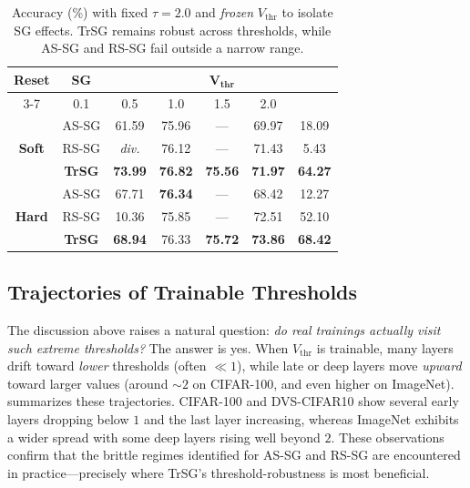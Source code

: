 \begin{table}[h]
\centering
\small
\begin{tabular}{cc|ccccc}
\toprule
\textbf{Reset} & \textbf{SG} & \multicolumn{5}{c}{$\boldsymbol{V_{\text{thr}}}$} \\
\cmidrule(lr){3-7}
\multicolumn{2}{c|}{} & 0.1 & 0.5 & 1.0 & 1.5 & 2.0 \\
\midrule
\multirow{3}{*}{\textbf{Soft}}
  & AS-SG          & 61.59          & 75.96          & ---            & 69.97          & 18.09 \\
  & RS-SG          & \emph{div.}    & 76.12          & ---            & 71.43          & 5.43  \\
  & \textbf{TrSG}  & \textbf{73.99} & \textbf{76.82} & \textbf{75.56} & \textbf{71.97} & \textbf{64.27} \\
\midrule
\multirow{3}{*}{\textbf{Hard}}
  & AS-SG          & 67.71          & \textbf{76.34} & ---            & 68.42          & 12.27 \\
  & RS-SG          & 10.36          & 75.85          & ---            & 72.51          & 52.10 \\
  & \textbf{TrSG}  & \textbf{68.94} & 76.33          & \textbf{75.72} & \textbf{73.86} & \textbf{68.42} \\
\bottomrule
\end{tabular}
\caption{Accuracy (\%) with fixed $\tau=2.0$ and \emph{frozen} $V_{\text{thr}}$ to isolate SG effects. TrSG remains robust across thresholds, while AS-SG and RS-SG fail outside a narrow range.}
\label{tab:no_training_results}
\end{table}

\subsection{Trajectories of Trainable Thresholds}
\label{subsec:exp_threshold_trajectories}

The discussion above raises a natural question: \emph{do real trainings actually visit such extreme thresholds?} The answer is yes. When $V_{\text{thr}}$ is trainable, many layers drift toward \emph{lower} thresholds (often $\ll 1$), while late or deep layers move \emph{upward} toward larger values (around $\sim2$ on CIFAR-100, and even higher on ImageNet).  summarizes these trajectories. CIFAR-100 and DVS-CIFAR10 show several early layers dropping below $1$ and the last layer increasing, whereas ImageNet exhibits a wider spread with some deep layers rising well beyond $2$. These observations confirm that the brittle regimes identified for AS-SG and RS-SG are encountered in practice—precisely where TrSG's threshold-robustness is most beneficial.

